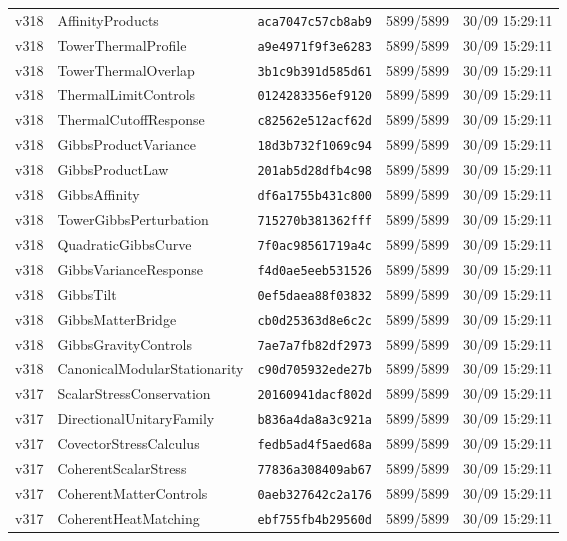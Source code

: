 \documentclass[11pt]{article}
\theoremstyle{definition}\newtheorem{deriv}{Derivação}
\begin{document}
{\begin{longtable}{@{}lllll@{}}
v318 & AffinityProducts & \texttt{aca7047c57cb8ab9} & 5899/5899 & 30/09 15:29:11 \\
v318 & TowerThermalProfile & \texttt{a9e4971f9f3e6283} & 5899/5899 & 30/09 15:29:11 \\
v318 & TowerThermalOverlap & \texttt{3b1c9b391d585d61} & 5899/5899 & 30/09 15:29:11 \\
v318 & ThermalLimitControls & \texttt{0124283356ef9120} & 5899/5899 & 30/09 15:29:11 \\
v318 & ThermalCutoffResponse & \texttt{c82562e512acf62d} & 5899/5899 & 30/09 15:29:11 \\
v318 & GibbsProductVariance & \texttt{18d3b732f1069c94} & 5899/5899 & 30/09 15:29:11 \\
v318 & GibbsProductLaw & \texttt{201ab5d28dfb4c98} & 5899/5899 & 30/09 15:29:11 \\
v318 & GibbsAffinity & \texttt{df6a1755b431c800} & 5899/5899 & 30/09 15:29:11 \\
v318 & TowerGibbsPerturbation & \texttt{715270b381362fff} & 5899/5899 & 30/09 15:29:11 \\
v318 & QuadraticGibbsCurve & \texttt{7f0ac98561719a4c} & 5899/5899 & 30/09 15:29:11 \\
v318 & GibbsVarianceResponse & \texttt{f4d0ae5eeb531526} & 5899/5899 & 30/09 15:29:11 \\
v318 & GibbsTilt & \texttt{0ef5daea88f03832} & 5899/5899 & 30/09 15:29:11 \\
v318 & GibbsMatterBridge & \texttt{cb0d25363d8e6c2c} & 5899/5899 & 30/09 15:29:11 \\
v318 & GibbsGravityControls & \texttt{7ae7a7fb82df2973} & 5899/5899 & 30/09 15:29:11 \\
v318 & CanonicalModularStationarity & \texttt{c90d705932ede27b} & 5899/5899 & 30/09 15:29:11 \\
v317 & ScalarStressConservation & \texttt{20160941dacf802d} & 5899/5899 & 30/09 15:29:11 \\
v317 & DirectionalUnitaryFamily & \texttt{b836a4da8a3c921a} & 5899/5899 & 30/09 15:29:11 \\
v317 & CovectorStressCalculus & \texttt{fedb5ad4f5aed68a} & 5899/5899 & 30/09 15:29:11 \\
v317 & CoherentScalarStress & \texttt{77836a308409ab67} & 5899/5899 & 30/09 15:29:11 \\
v317 & CoherentMatterControls & \texttt{0aeb327642c2a176} & 5899/5899 & 30/09 15:29:11 \\
v317 & CoherentHeatMatching & \texttt{ebf755fb4b29560d} & 5899/5899 & 30/09 15:29:11 \\

\end{longtable}}
\end{document}
